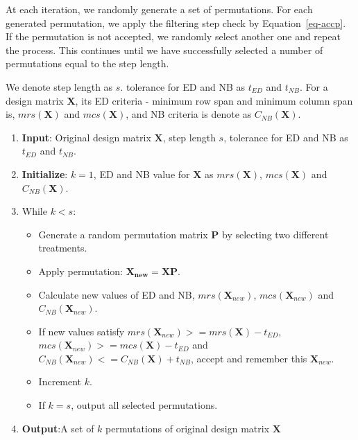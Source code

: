 \documentclass[
  a4paper,
  oneside,
  openany,
  12pt,
  onecolumn]{book}
\providecommand{\tightlist}{%
  \setlength{\itemsep}{0pt}\setlength{\parskip}{0pt}}\usepackage{longtable,booktabs,array}
\theoremstyle{definition}
\theoremstyle{plain}
\theoremstyle{remark}
\begin{document}
At each iteration, we randomly generate a set of permutations. For each
generated permutation, we apply the filtering step check by
Equation~\ref{eq-accp}. If the permutation is not accepted, we randomly
select another one and repeat the process. This continues until we have
successfully selected a number of permutations equal to the step length.

We denote step length as \(s\). tolerance for ED and NB as \(t_{ED}\)
and \(t_{NB}\). For a design matrix \(\boldsymbol{X}\), its ED criteria
- minimum row span and minimum column span is, \(mrs({\boldsymbol{X}})\)
and \(mcs({\boldsymbol{X}})\), and NB criteria is denote as
\(C_{NB}({\boldsymbol{X}})\).

\begin{enumerate}
\def\labelenumi{\arabic{enumi}.}
\tightlist
\item
  \textbf{Input}: Original design matrix \(\boldsymbol{X}\), step length
  \(s\), tolerance for ED and NB as \(t_{ED}\) and \(t_{NB}\).
\item
  \textbf{Initialize}: \(k = 1\), ED and NB value for \(\boldsymbol{X}\)
  as \(mrs({\boldsymbol{X}})\), \(mcs({\boldsymbol{X}})\) and
  \(C_{NB}({\boldsymbol{X}})\).
\item
  While \(k < s\):

  \begin{itemize}
  \tightlist
  \item
    Generate a random permutation matrix \(\boldsymbol{P}\) by selecting
    two different treatments.
  \item
    Apply permutation: \(\boldsymbol{X_{new} = X P}\).
  \item
    Calculate new values of ED and NB, \(mrs({\boldsymbol{X}_{new}})\),
    \(mcs({\boldsymbol{X}_{new}})\) and
    \(C_{NB}({\boldsymbol{X}_{new}})\).
  \item
    If new values satisfy
    \(mrs({\boldsymbol{X}_{new}}) >= mrs({\boldsymbol{X}}) - t_{ED}\),
    \(mcs({\boldsymbol{X}_{new}}) >= mcs({\boldsymbol{X}}) - t_{ED}\)
    and
    \(C_{NB}({\boldsymbol{X}_{new}}) <= C_{NB}({\boldsymbol{X}}) + t_{NB}\),
    accept and remember this \(\boldsymbol{X}_{new}\).
  \item
    Increment \(k\).
  \item
    If \(k = s\), output all selected permutations.
  \end{itemize}
\item
  \textbf{Output}:A set of \(k\) permutations of original design matrix
  \(\boldsymbol{X}\)
\end{enumerate}
\end{document}
